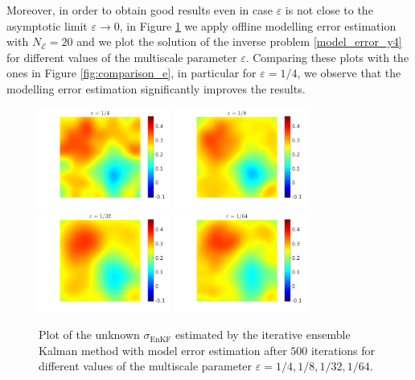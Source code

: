 \documentclass[10pt]{article}
\begin{document}
Moreover, in order to obtain good results even in case $\varepsilon$ is not close to the asymptotic limit $\varepsilon \to 0$, in Figure \ref{fig:comparison_e_model_error} we apply offline modelling error estimation with $N_{\mathcal{E}} = 20$ and we plot the solution of the inverse problem \eqref{model_error_y4} for different values of the multiscale parameter $\varepsilon$. Comparing these plots with the ones in Figure \ref{fig:comparison_e}, in particular for $\varepsilon = 1/4$, we observe that the modelling error estimation significantly improves the results.

\begin{figure}[t]
\centering
\includegraphics[width = 0.39\textwidth]{figures/ensemble_500_e4_model_error}
\includegraphics[width = 0.39\textwidth]{figures/ensemble_500_e8_model_error}
\\
\includegraphics[width = 0.39\textwidth]{figures/ensemble_500_e32_model_error}
\includegraphics[width = 0.39\textwidth]{figures/ensemble_500_e64_model_error}
\caption{Plot of the unknown $\sigma_{\mathrm{EnKF}}$ estimated by the iterative ensemble Kalman method with model error estimation after $500$ iterations for different values of the multiscale parameter $\varepsilon = 1/4, 1/8, 1/32, 1/64$.}
\label{fig:comparison_e_model_error}
\end{figure}
\end{document}

